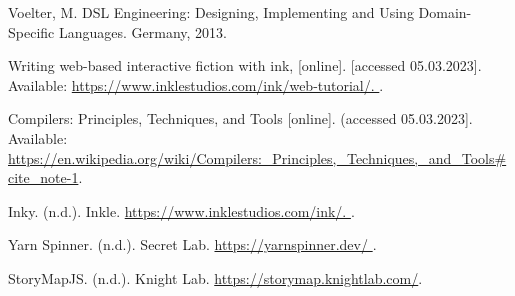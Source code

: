 \begin{thebibliography}{99}
\singlespace \normalsize

  Voelter, M. DSL Engineering: Designing, Implementing and Using Domain-Specific Languages. Germany, 2013.

  Writing web-based interactive fiction with ink, [online]. [accessed 05.03.2023]. Available: 
  \url{https://www.inklestudios.com/ink/web-tutorial/. }.

  Compilers: Principles, Techniques, and Tools [online]. (accessed 05.03.2023]. Available: 
  \url{https://en.wikipedia.org/wiki/Compilers:_Principles,_Techniques,_and_Tools#cite_note-1}.
  
  Inky. (n.d.). Inkle. 
  \url{https://www.inklestudios.com/ink/. }.

  Yarn Spinner. (n.d.). Secret Lab.
  \url{https://yarnspinner.dev/ }.

  StoryMapJS. (n.d.). Knight Lab. 
  \url{https://storymap.knightlab.com/}.

\end{thebibliography}